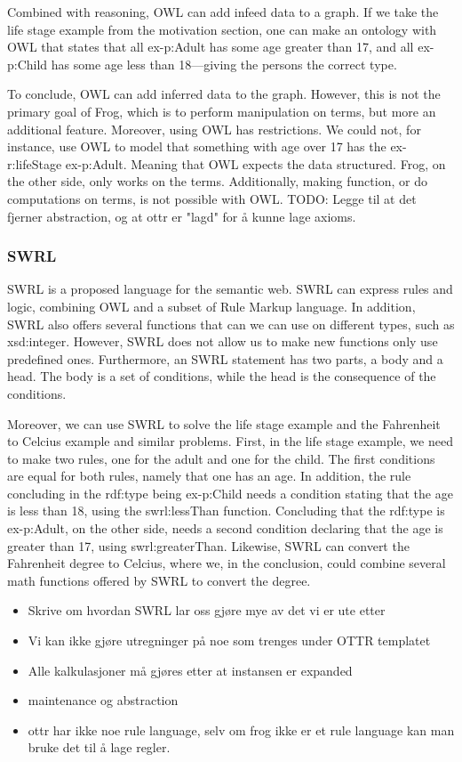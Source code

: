 \para
Combined with reasoning, OWL can add infeed data to a graph. If we take the life stage example from the motivation section, one can make an ontology with OWL that states that all ex-p:Adult has some age greater than 17, and all ex-p:Child has some age less than 18—giving the persons the correct type.

\para 
To conclude, OWL can add inferred data to the graph. However, this is not the primary goal of Frog, which is to perform manipulation on terms, but more an additional feature. Moreover, using OWL has restrictions. We could not, for instance, use OWL to model that something with age over 17 has the ex-r:lifeStage ex-p:Adult. Meaning that OWL expects the data structured. Frog, on the other side, only works on the terms. Additionally, making function, or do computations on terms, is not possible with OWL. TODO: Legge til at det fjerner abstraction, og at ottr er "lagd" for å kunne lage axioms. 

\subsubsection{SWRL}
SWRL is a proposed language for the semantic web. SWRL can express rules and logic, combining OWL and a subset of Rule Markup language. In addition, SWRL also offers several functions that can we can use on different types, such as xsd:integer. However, SWRL does not allow us to make new functions only use predefined ones. Furthermore, an SWRL statement has two parts, a body and a head. The body is a set of conditions, while the head is the consequence of the conditions.

\para
Moreover, we can use SWRL to solve the life stage example and the Fahrenheit to Celcius example and similar problems. First, in the life stage example, we need to make two rules, one for the adult and one for the child. The first conditions are equal for both rules, namely that one has an age. In addition, the rule concluding in the rdf:type being ex-p:Child needs a condition stating that the age is less than 18, using the swrl:lessThan function. Concluding that the rdf:type is ex-p:Adult, on the other side, needs a second condition declaring that the age is greater than 17, using swrl:greaterThan. Likewise, SWRL can convert the Fahrenheit degree to Celcius, where we, in the conclusion, could combine several math functions offered by SWRL to convert the degree.

\para
\begin{itemize}
    \item Skrive om hvordan SWRL lar oss gjøre mye av det vi er ute etter
    \item Vi kan ikke gjøre utregninger på noe som trenges under OTTR templatet
    \item Alle kalkulasjoner må gjøres etter at instansen er expanded 
    \item maintenance og abstraction
    \item ottr har ikke noe rule language, selv om frog ikke er et rule language kan man bruke det til å lage regler. 
\end{itemize}

